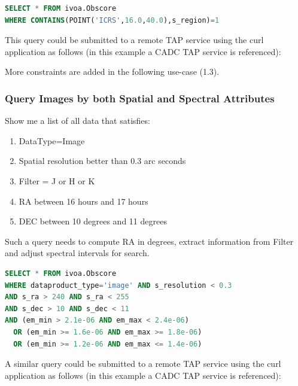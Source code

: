 \documentclass[11pt,a4paper]{ivoa}
\begin{document}
\begin{lstlisting}[language=SQL, flexiblecolumns=true]
SELECT * FROM ivoa.Obscore
WHERE CONTAINS(POINT('ICRS',16.0,40.0),s_region)=1
\end{lstlisting}

This query could be submitted to a remote TAP service using the curl application as follows (in this example a CADC TAP
service is referenced):


More constraints are added in the following use-case (1.3).

\subsubsection*{Query Images by both Spatial and Spectral Attributes}

Show me a list of all data that satisfies:

\begin{enumerate}
\item DataType=Image
\item Spatial resolution better than 0.3 arc seconds
\item Filter = J or H or K
\item RA between 16 hours and 17 hours
\item DEC between 10 degrees and 11 degrees
\end{enumerate}
Such a query needs to compute RA in degrees, extract information from Filter and adjust spectral intervals for search.

\begin{lstlisting}[language=SQL,flexiblecolumns=true]
SELECT * FROM ivoa.Obscore
WHERE dataproduct_type='image' AND s_resolution < 0.3
AND s_ra > 240 AND s_ra < 255
AND s_dec > 10 AND s_dec < 11
AND (em_min > 2.1e-06 AND em_max < 2.4e-06)
  OR (em_min >= 1.6e-06 AND em_max >= 1.8e-06)
  OR (em_min >= 1.2e-06 AND em_max <= 1.4e-06)
\end{lstlisting}

A similar query could be submitted to a remote TAP service using the curl application as follows (in this example a CADC
TAP service is referenced):

\end{document}
